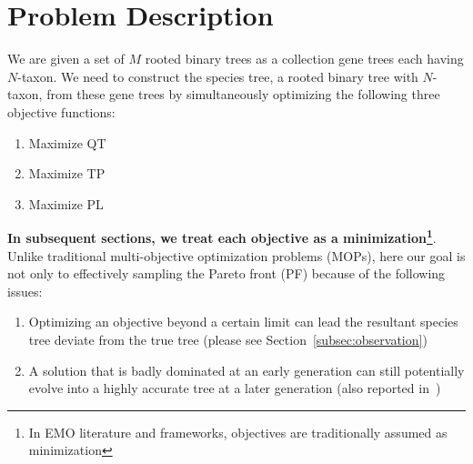 \section{Problem Description}
\label{sec:problem}
We are given a set of $M$ rooted binary trees as a collection gene trees each having $N$-taxon. We need to construct the species tree, a rooted binary tree with $N$-taxon, from these gene trees by simultaneously optimizing the following three objective functions:  
\begin{enumerate}[label=$F_\arabic*$)]        
	\item Maximize QT 
	\item Maximize TP
	\item Maximize PL 
\end{enumerate}
\textbf{In subsequent sections, we treat each objective as a minimization\footnote{In EMO literature and frameworks, objectives are traditionally assumed as minimization}}. Unlike traditional multi-objective optimization problems (MOPs), here our goal is not only to effectively sampling the Pareto front (PF) because of the following issues:
\begin{enumerate}[label=$I_\arabic*$]
	\item \label{item:i1} Optimizing an objective beyond a certain limit can lead the resultant species tree deviate from the true tree (please see Section~\ref{subsec:observation})
	\item \label{item:i2} A solution that is badly dominated at an early generation can still potentially evolve into a highly accurate tree at a later generation (also reported in~\cite{qu2010multi})
\end{enumerate}

